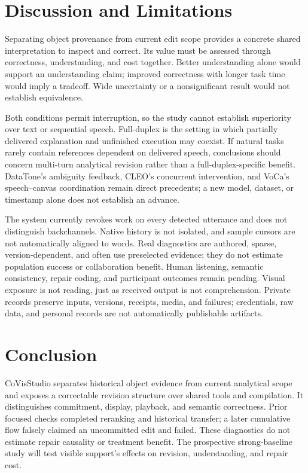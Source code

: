 \documentclass[conference,10pt,letterpaper]{IEEEtran}
\newcommand{\sys}{CoVisStudio}
\begin{document}
\section{Discussion and Limitations}
Separating object provenance from current edit scope provides a concrete shared interpretation to inspect and correct. Its value must be assessed through correctness, understanding, and cost together. Better understanding alone would support an understanding claim; improved correctness with longer task time would imply a tradeoff. Wide uncertainty or a nonsignificant result would not establish equivalence.

Both conditions permit interruption, so the study cannot establish superiority over text or sequential speech. Full-duplex is the setting in which partially delivered explanation and unfinished execution may coexist. If natural tasks rarely contain references dependent on delivered speech, conclusions should concern multi-turn analytical revision rather than a full-duplex-specific benefit. DataTone's ambiguity feedback, CLEO's concurrent intervention, and VoCa's speech--canvas coordination remain direct precedents; a new model, dataset, or timestamp alone does not establish an advance.

The system currently revokes work on every detected utterance and does not distinguish backchannels. Native history is not isolated, and sample cursors are not automatically aligned to words. Real diagnostics are authored, sparse, version-dependent, and often use preselected evidence; they do not estimate population success or collaboration benefit. Human listening, semantic consistency, repair coding, and participant outcomes remain pending. Visual exposure is not reading, just as received output is not comprehension. Private records preserve inputs, versions, receipts, media, and failures; credentials, raw data, and personal records are not automatically publishable artifacts.

\section{Conclusion}
\sys{} separates historical object evidence from current analytical scope and exposes a correctable revision structure over shared tools and compilation. It distinguishes commitment, display, playback, and semantic correctness. Prior focused checks completed reranking and historical transfer; a later cumulative flow falsely claimed an uncommitted edit and failed. These diagnostics do not estimate repair causality or treatment benefit. The prospective strong-baseline study will test visible support's effects on revision, understanding, and repair cost.
\balance


\end{document}
